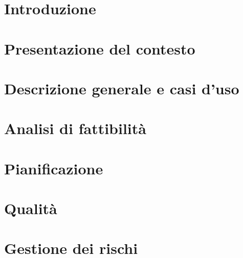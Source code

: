 


\def\DOCUMENTO 		{Piano di Progetto\\}
\def\VERSIONE 		{1.0.0\\}

\def\REDATTORI		{}

\def\VERIFICATORI	{}

\def\RESPONSABILE	{}

\def\USO			{}

\def\DISTRIBUZIONE	{\GRUPPO{}\\
					& \COMMITTENTE{}\\}

\def\DESCRIZIONE	{}

\def\INDICE		{true} 		%
\def\TABELLE	{true} 		%
\def\FIGURE		{true} 		%




\section{Introduzione}

\newpage

\section{Presentazione del contesto}

\newpage

\section{Descrizione generale e casi d'uso}

\newpage

\section{Analisi di fattibilità}

\newpage

\section{Pianificazione}

\newpage

\section{Qualità}

\newpage


\section{Gestione dei rischi}

\newpage



